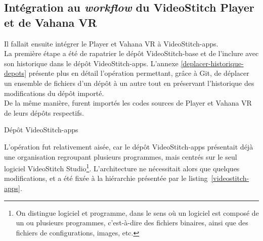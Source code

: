 \subsection{Intégration au \textit{workflow} du VideoStitch Player et de Vahana VR}
Il fallait ensuite intégrer le Player et Vahana VR à VideoStitch-apps.\\
La première étape a été de rapatrier le dépôt VideoStitch-base et de l'inclure
avec son historique dans le dépôt VideoStitch-apps. L'annexe \ref{deplacer-historique-depots}
présente plus en détail l'opération permettant, grâce à Git, de déplacer un ensemble 
de fichiers d'un dépôt à un autre tout en préservant l'historique des modifications du dépôt importé.\\
De la même manière, furent importés les codes sources de Player et Vahana VR de 
leurs dépôts respectifs.\\
\begin{listing}
  \caption{Dépôt VideoStitch-apps}
  \label{videostitch-apps}
\end{listing}
L'opération fut relativement aisée, car le dépôt VideoStitch-apps présentait déjà
une organisation regroupant plusieurs programmes, mais centrés sur le seul logiciel
VideoStitch Studio\footnote{On distingue logiciel et programme, dans le sens où un logiciel
est composé de un ou plusieurs programmes, c'est-à-dire des fichiers binaires, ainsi que des
fichiers de configurations, images, etc.\cite{logiciel}}. L'architecture ne nécessitait alors que quelques modifications, et
a été fixée à la hiérarchie présentée par le listing~\ref{videostitch-apps}.\\

